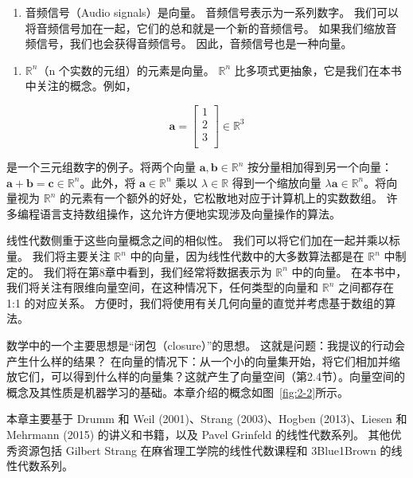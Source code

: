 \begin{enumerate}
\item 音频信号（Audio signals）是向量。 音频信号表示为一系列数字。 我们可以将音频信号加在一起，它们的总和就是一个新的音频信号。 如果我们缩放音频信号，我们也会获得音频信号。 因此，音频信号也是一种向量。
\end{enumerate}

\begin{enumerate}
\item $ \mathbb{R}^n $（n 个实数的元组）的元素是向量。  $ \mathbb{R}^n $ 比多项式更抽象，它是我们在本书中关注的概念。例如，
\end{enumerate}

\begin{equation}
\boldsymbol{a} = \begin{bmatrix} 1 \\ 2 \\ 3 \\ \end{bmatrix} \in \mathbb{R}^3
\tag{2.1}\label{eq:2-1}
\end{equation}

是一个三元组数字的例子。将两个向量 $ \boldsymbol{a}, \boldsymbol{b} \in \mathbb{R}^n $ 按分量相加得到另一个向量：$ \boldsymbol{a} + \boldsymbol{b} = \boldsymbol{c} \in \mathbb{R}^n $。此外，将 $ \boldsymbol{a} \in \mathbb{R}^n $ 乘以 $ \lambda \in \mathbb{R} $ 得到一个缩放向量 $ \lambda \boldsymbol{a} \in \mathbb{R}^n $。将向量视为 $ \mathbb{R}^n $ 的元素有一个额外的好处，它松散地对应于计算机上的实数数组。 许多编程语言支持数组操作，这允许方便地实现涉及向量操作的算法。

线性代数侧重于这些向量概念之间的相似性。 我们可以将它们加在一起并乘以标量。 我们将主要关注 $ \mathbb{R}^n $ 中的向量，因为线性代数中的大多数算法都是在 $ \mathbb{R}^n $ 中制定的。 我们将在第8章中看到，我们经常将数据表示为 $ \mathbb{R}^n $ 中的向量。 在本书中，我们将关注有限维向量空间，在这种情况下，任何类型的向量和 $ \mathbb{R}^n $ 之间都存在 1:1 的对应关系。 方便时，我们将使用有关几何向量的直觉并考虑基于数组的算法。

数学中的一个主要思想是“闭包（closure）”的思想。 这就是问题：我提议的行动会产生什么样的结果？ 在向量的情况下：从一个小的向量集开始，将它们相加并缩放它们，可以得到什么样的向量集？这就产生了向量空间（第2.4节）。向量空间的概念及其性质是机器学习的基础。本章介绍的概念如图~\ref{fig:2-2}所示。

本章主要基于 Drumm 和 Weil (2001)、Strang (2003)、Hogben (2013)、Liesen 和 Mehrmann (2015) 的讲义和书籍，以及 Pavel Grinfeld 的线性代数系列。 其他优秀资源包括 Gilbert Strang 在麻省理工学院的线性代数课程和 3Blue1Brown 的线性代数系列。


